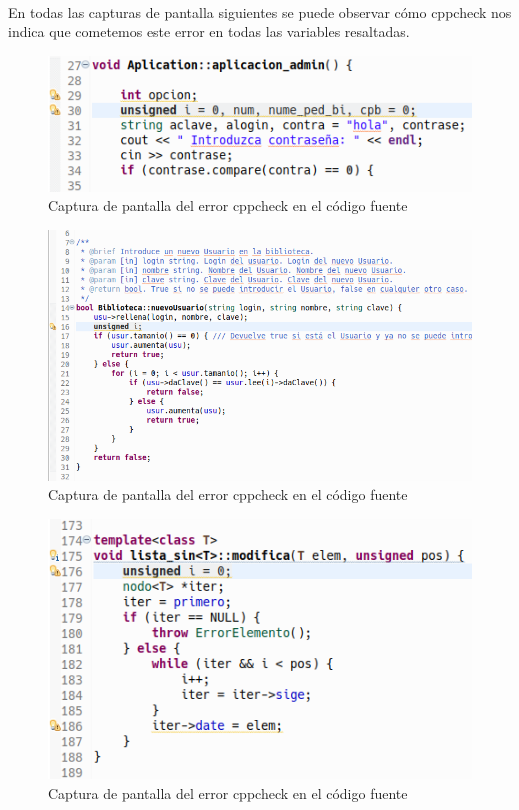 			\paragraph{}En todas las capturas de pantalla siguientes se puede observar cómo cppcheck nos indica que cometemos este error en todas las variables resaltadas.
			
			\begin{figure}[H]
				\centering
				\includegraphics[scale=0.7]{img/captura64.png}
				\caption{Captura de pantalla del error cppcheck en el código fuente}
				\label{captura64}
			\end{figure}
		
			\begin{figure}[H]
				\centering
				\includegraphics[scale=0.55]{img/captura65.png}
				\caption{Captura de pantalla del error cppcheck en el código fuente}
				\label{captura65}
			\end{figure}
		
			\begin{figure}[H]
				\centering
				\includegraphics[scale=0.55]{img/captura66.png}
				\caption{Captura de pantalla del error cppcheck en el código fuente}
				\label{captura66}
			\end{figure}
		
